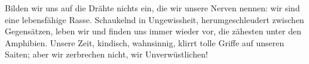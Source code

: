 Bilden wir uns auf die Drähte nichts ein, die wir unsere Nerven nennen: wir sind eine lebensfähige Rasse. Schaukelnd in Ungewissheit, herumgeschleudert zwischen Gegensätzen, leben wir und finden uns immer wieder vor, die zähesten unter den Amphibien. Unsere Zeit, kindisch, wahnsinnig, klirrt tolle Griffe auf unseren Saiten; aber wir zerbrechen nicht, wir Unverwüstlichen!
\par

